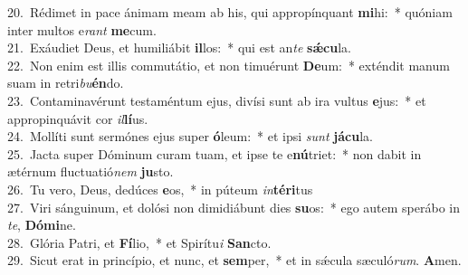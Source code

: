 {20.~}Rédimet in pace ánimam meam ab his, qui appropínquant \textbf{mi}hi:~* quóniam inter multos e\textit{rant} \textbf{me}cum.\\
{21.~}Exáudiet Deus, et humiliábit \textbf{il}los:~* qui est an\textit{te} \textbf{sǽ}\textbf{cu}la.\\
{22.~}Non enim est illis commutátio, et non timuérunt \textbf{De}um:~* exténdit manum suam in retri\textit{bu}\textbf{én}do.\\
{23.~}Contaminavérunt testaméntum ejus, divísi sunt ab ira vultus \textbf{e}jus:~* et appropinquávit cor \textit{il}\textbf{lí}us.\\
{24.~}Mollíti sunt sermónes ejus super \textbf{ó}leum:~* et ipsi \textit{sunt} \textbf{já}\textbf{cu}la.\\
{25.~}Jacta super Dóminum curam tuam, et ipse te e\textbf{nú}triet:~* non dabit in ætérnum fluctuatió\textit{nem} \textbf{ju}sto.\\
{26.~}Tu vero, Deus, dedúces \textbf{e}os,~* in púteum \textit{in}\textbf{té}\textbf{ri}tus\\
{27.~}Viri sánguinum, et dolósi non dimidiábunt dies \textbf{su}os:~* ego autem sperábo in \textit{te}, \textbf{Dó}\textbf{mi}ne.\\
{28.~}Glória Patri, et \textbf{Fí}lio,~* et Spirítu\textit{i} \textbf{San}cto.\\
{29.~}Sicut erat in princípio, et nunc, et \textbf{sem}per,~* et in sǽcula sæculó\textit{rum}. \textbf{A}men.\\
